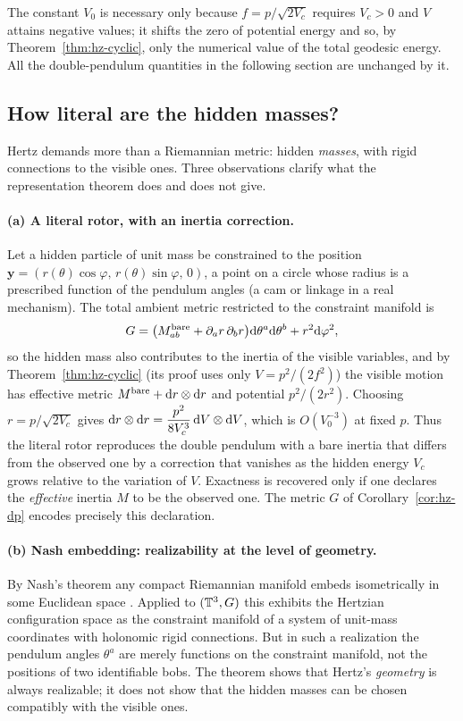 The constant $V_0$ is necessary only because $f=p/\sqrt{2V_c}$ requires
$V_c>0$ and $V$ attains negative values; it shifts the zero of potential
energy and so, by Theorem~\ref{thm:hz-cyclic}, only the numerical value of the
total geodesic energy. All the double-pendulum quantities in the following
section are unchanged by it.

\subsection{How literal are the hidden masses?}

Hertz demands more than a Riemannian metric: hidden \emph{masses}, with
rigid connections to the visible ones. Three observations clarify what the
representation theorem does and does not give.

\paragraph{(a) A literal rotor, with an inertia correction.}
Let a hidden particle of unit mass be constrained to the position
$\mathbf y=(r(\theta)\cos\varphi,\,r(\theta)\sin\varphi,\,0)$, a point on a circle
whose radius is a prescribed function of the pendulum angles (a cam or linkage
in a real mechanism). The total ambient metric restricted to the constraint manifold is
\[
  G=\bigl(M^{\rm bare}_{ab}+\partial_ar\,\partial_br\bigr)\mathrm{d}\theta^a\mathrm{d}\theta^b+r^2\mathrm{d}\varphi^2 ,
\]
so the hidden mass also contributes to the inertia of the visible variables,
and by Theorem~\ref{thm:hz-cyclic} (its proof uses only $V=p^2/(2f^2)$) the visible motion has effective metric
$M^{\rm bare}+\mathrm{d} r\otimes\mathrm{d} r$ and potential $p^2/(2r^2)$. Choosing $r=p/\sqrt{2V_c}$ gives
$\mathrm{d} r\otimes\mathrm{d} r=\dfrac{p^2}{8V_c^{3}}\,\mathrm{d} V\otimes\mathrm{d} V$, which is $O(V_0^{-3})$ at fixed $p$.
Thus the literal rotor reproduces the double pendulum with a bare inertia that differs from
the observed one by a correction that vanishes as the hidden energy $V_c$ grows relative to
the variation of $V$. Exactness is recovered only if one declares the \emph{effective}
inertia $M$ to be the observed one. The metric $G$ of Corollary~\ref{cor:hz-dp}
encodes precisely this declaration.

\paragraph{(b) Nash embedding: realizability at the level of geometry.}
By Nash's theorem any compact Riemannian manifold embeds isometrically in
some Euclidean space \cite{hdp:nash1956}. Applied to $(\mathbb{T}^3,G)$ this exhibits
the Hertzian configuration space as the constraint manifold of a system of
unit-mass coordinates with holonomic rigid connections. But in such a
realization the pendulum angles $\theta^a$ are merely functions on the
constraint manifold, not the positions of two identifiable bobs. The theorem
shows that Hertz's \emph{geometry} is always realizable; it does not show that
the hidden masses can be chosen compatibly with the visible ones.

